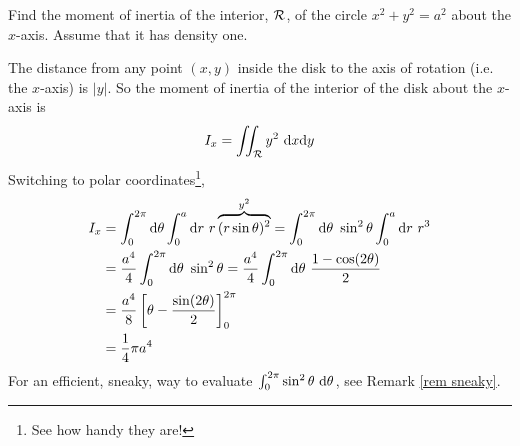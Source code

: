 \begin{eg}[Disk]\label{eg moment disk}
Find the moment of inertia of the interior, $\mathcal{R}$,
of the circle $x^2+y^2=a^2$ about the $x$-axis. 
Assume that it has density one.

\soln 
The distance from any point $(x,y)$ inside the disk to the axis of
rotation (i.e. the $x$-axis) is $|y|$. 
So the moment of inertia of
the interior of the disk about the $x$-axis is
\begin{equation*}
I_x = \dblInt_\cR y^2\ \dee{x}\dee{y}
\end{equation*}
Switching to polar coordinates\footnote{See how handy they are!},
\begin{align*}
I_x &= \int_0^{2\pi}\mathrm{d}\theta\int_0^{a}\mathrm{d}r\ r
       \overbrace{(r\sin\theta)^2}^{y^2} 
= \int_0^{2\pi}\mathrm{d}\theta\ \sin^2\theta\int_0^a\mathrm{d}r\ r^3 \\
&=\frac{a^4}{4}\int_0^{2\pi}\mathrm{d}\theta\ \sin^2\theta
=\frac{a^4}{4} \int_0^{2\pi}\mathrm{d}\theta\ \frac{1-\cos(2\theta)}{2}\\
&=\frac{a^4}{8} \left[\theta-\frac{\sin(2\theta)}{2}\right]_0^{2\pi}\\
&=\frac{1}{4}\pi a^4
\end{align*}
For an efficient, sneaky, way to evaluate
$ \int_0^{2\pi} \sin^2\theta\ \mathrm{d}\theta$, see
Remark \ref{rem sneaky}.
\end{eg}

